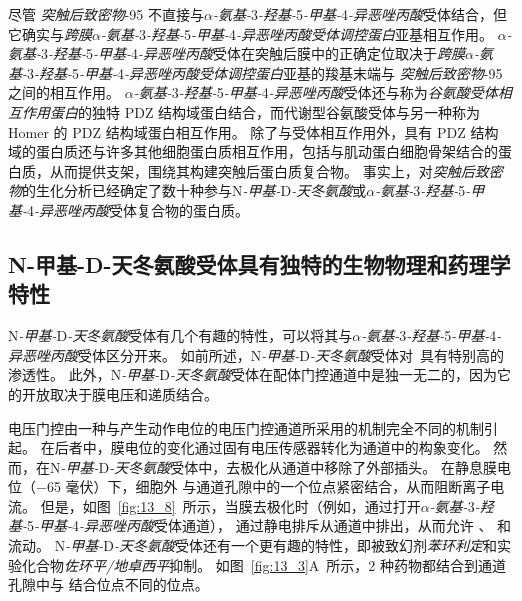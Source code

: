 尽管 \textit{突触后致密物}-95 不直接与\textit{$\alpha$-氨基-}3\textit{-羟基-}5\textit{-甲基-}4\textit{-异恶唑丙酸}受体结合，但它确实与\textit{跨膜$\alpha$-氨基-}3\textit{-羟基-}5\textit{-甲基-}4\textit{-异恶唑丙酸受体调控蛋白}亚基相互作用。
\textit{$\alpha$-氨基-}3\textit{-羟基-}5\textit{-甲基-}4\textit{-异恶唑丙酸}受体在突触后膜中的正确定位取决于\textit{跨膜$\alpha$-氨基-}3\textit{-羟基-}5\textit{-甲基-}4\textit{-异恶唑丙酸受体调控蛋白}亚基的羧基末端与 \textit{突触后致密物}-95 之间的相互作用。
\textit{$\alpha$-氨基-}3\textit{-羟基-}5\textit{-甲基-}4\textit{-异恶唑丙酸}受体还与称为\textit{谷氨酸受体相互作用蛋白}的独特 PDZ 结构域蛋白结合，而代谢型谷氨酸受体与另一种称为 Homer 的 PDZ 结构域蛋白相互作用。
除了与受体相互作用外，具有 PDZ 结构域的蛋白质还与许多其他细胞蛋白质相互作用，包括与肌动蛋白细胞骨架结合的蛋白质，从而提供支架，围绕其构建突触后蛋白质复合物。
事实上，对\textit{突触后致密物}的生化分析已经确定了数十种参与N\textit{-甲基-}D\textit{-天冬氨酸}或\textit{$\alpha$-氨基-}3\textit{-羟基-}5\textit{-甲基-}4\textit{-异恶唑丙酸}受体复合物的蛋白质。



\subsection{N-甲基-D-天冬氨酸受体具有独特的生物物理和药理学特性}

N\textit{-甲基-}D\textit{-天冬氨酸}受体有几个有趣的特性，可以将其与\textit{$\alpha$-氨基-}3\textit{-羟基-}5\textit{-甲基-}4\textit{-异恶唑丙酸}受体区分开来。
如前所述，N\textit{-甲基-}D\textit{-天冬氨酸}受体对~具有特别高的渗透性。
此外，N\textit{-甲基-}D\textit{-天冬氨酸}受体在配体门控通道中是独一无二的，因为它的开放取决于膜电压和递质结合。


电压门控由一种与产生动作电位的电压门控通道所采用的机制完全不同的机制引起。
在后者中，膜电位的变化通过固有电压传感器转化为通道中的构象变化。
然而，在N\textit{-甲基-}D\textit{-天冬氨酸}受体中，去极化从通道中移除了外部插头。
在静息膜电位（−65 毫伏）下，细胞外  与通道孔隙中的一个位点紧密结合，从而阻断离子电流。
但是，如图~\ref{fig:13_8}~所示，当膜去极化时（例如，通过打开\textit{$\alpha$-氨基-}3\textit{-羟基-}5\textit{-甲基-}4\textit{-异恶唑丙酸}受体通道）， 通过静电排斥从通道中排出，从而允许 、 和  流动。
N\textit{-甲基-}D\textit{-天冬氨酸}受体还有一个更有趣的特性，即被致幻剂\textit{苯环利定}和实验化合物\textit{佐环平/地卓西平}抑制。
如图~\ref{fig:13_3}A~所示，2 种药物都结合到通道孔隙中与  结合位点不同的位点。


